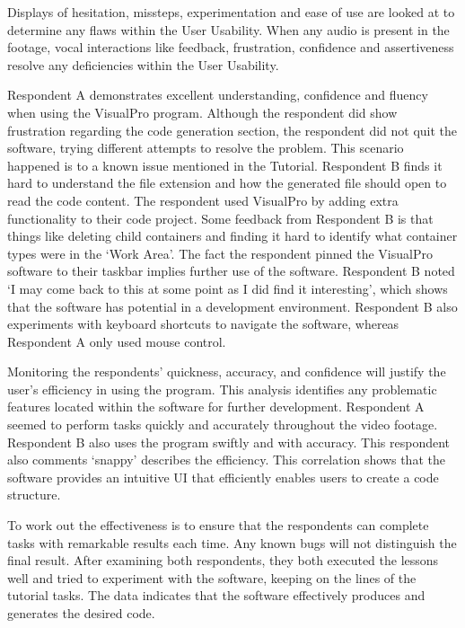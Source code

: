 \documentclass[12pt]{report} %
\begin{document}
			Displays of hesitation, missteps, experimentation and ease of use are looked at to determine any flaws within the User Usability. When any audio is present in the footage, vocal interactions like feedback, frustration, confidence and assertiveness resolve any deficiencies within the User Usability. 

			Respondent A demonstrates excellent understanding, confidence and fluency when using the VisualPro program. Although the respondent did show frustration regarding the code generation section, the respondent did not quit the software, trying different attempts to resolve the problem. This scenario happened is to a known issue mentioned in the Tutorial. Respondent B finds it hard to understand the file extension and how the generated file should open to read the code content. The respondent used VisualPro by adding extra functionality to their code project. Some feedback from Respondent B is that things like deleting child containers and finding it hard to identify what container types were in the `Work Area'. The fact the respondent pinned the VisualPro software to their taskbar implies further use of the software. Respondent B noted `I may come back to this at some point as I did find it interesting', which shows that the software has potential in a development environment. Respondent B also experiments with keyboard shortcuts to navigate the software, whereas Respondent A only used mouse control.
			
			Monitoring the respondents' quickness, accuracy, and confidence will justify the\\user's efficiency in using the program.  This analysis identifies any problematic features located within the software for further development. Respondent A seemed to perform tasks quickly and accurately throughout the video footage. Respondent B also uses the program swiftly and with accuracy. This respondent also comments `snappy' describes the efficiency. This correlation shows that the software provides an intuitive UI that efficiently enables users to create a code structure.

			To work out the effectiveness is to ensure that the respondents can complete tasks with remarkable results each time. Any known bugs will not distinguish the final result. After examining both respondents, they both executed the lessons well and tried to experiment with the software, keeping on the lines of the tutorial tasks. The data indicates that the software effectively produces and generates the desired code.
\end{document}
